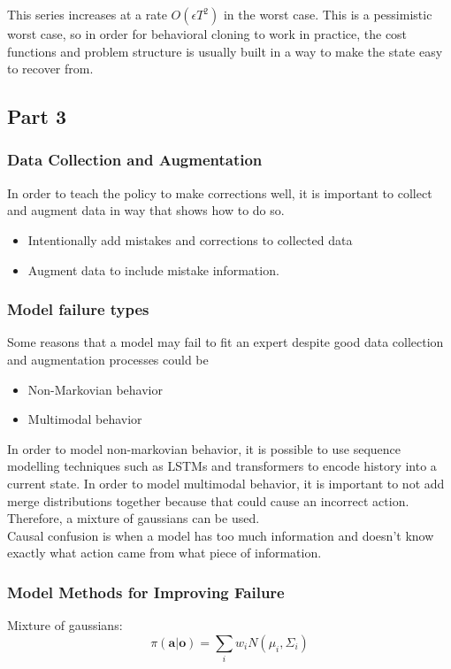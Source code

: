 This series increases at a rate $O(\epsilon T^2)$ in the worst case. This is a pessimistic worst case, so in order for behavioral cloning to work in practice, the cost functions and problem structure is usually built in a way to make the state easy to recover from.

\subsection{Part 3}
\subsubsection{Data Collection and Augmentation}
In order to teach the policy to make corrections well, it is important to collect and augment data in way that shows how to do so.
\begin{itemize}
  \item Intentionally add mistakes and corrections to collected data
  \item Augment data to include mistake information.
\end{itemize}

\subsubsection{Model failure types}
Some reasons that a model may fail to fit an expert despite good data collection and augmentation processes could be
\begin{itemize}
  \item Non-Markovian behavior
  \item Multimodal behavior
\end{itemize}
In order to model non-markovian behavior, it is possible to use sequence modelling techniques such as LSTMs and transformers to encode history into a current state. In order to model multimodal behavior, it is important to not add merge distributions together because that could cause an incorrect action. Therefore, a mixture of gaussians can be used.
\\ 
Causal confusion is when a model has too much information and doesn't know exactly what action came from what piece of information.

\subsubsection{Model Methods for Improving Failure}
Mixture of gaussians:
\begin{equation}
  \pi(\textbf{a} | \textbf{o}) = \sum_i w_i N(\mu_i, \Sigma_i)
\end{equation}


